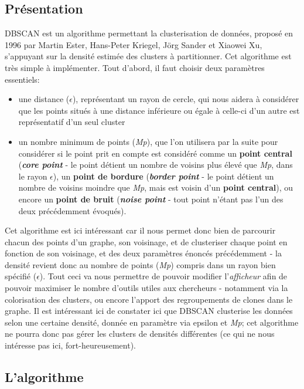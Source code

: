 \documentclass{report}
\begin{document}
\subsection{Présentation}
DBSCAN est un algorithme permettant la clusterisation de données, proposé en 1996 par Martin Ester, Hans-Peter Kriegel, Jörg Sander et Xiaowei Xu, s'appuyant sur la densité estimée des clusters à partitionner.
\newline
Cet algorithme est très simple à implémenter.
\newline
Tout d'abord, il faut choisir deux paramètres essentiels:
\begin{itemize}
\item une distance ($\epsilon$), représentant un rayon de cercle, qui nous aidera à considérer que les points situés à une distance inférieure ou égale à celle-ci d'un autre est représentatif d'un seul cluster
\item un nombre minimum de points (\textit{Mp}), que l'on utilisera par la suite pour considérer si le point prit en compte est considéré comme un \textbf{point central} (\textit{\textbf{core point}} - le point détient un nombre de voisins plus élevé que \textit{Mp}, dans le rayon $\epsilon$), un \textbf{point de bordure} (\textit{\textbf{border point}} - le point détient un nombre de voisins moindre que \textit{Mp}, mais est voisin d'un \textbf{point central}), ou encore un \textbf{point de bruit} (\textit{\textbf{noise point}} - tout point n'étant pas l'un des deux précédemment évoqués).
\end{itemize}
Cet algorithme est ici intéressant car il nous permet donc bien de parcourir chacun des points d'un graphe, son voisinage, et de clusteriser chaque point en fonction de son voisinage, et des deux paramètres énoncés précédemment - la densité revient donc au nombre de points (\textit{Mp}) compris dans un rayon bien spécifié ($\epsilon$). Tout ceci va nous permettre de pouvoir modifier l'\textit{afficheur} afin de pouvoir maximiser le nombre d'outils utiles aux chercheurs - notamment via la colorisation des clusters, ou encore l'apport des regroupements de clones dans le graphe.
\newline
Il est intéressant ici de constater ici que DBSCAN clusterise les données selon une certaine densité, donnée en paramètre via epsilon et \textit{Mp}; cet algorithme ne pourra donc pas gérer les clusters de densités différentes (ce qui ne nous intéresse pas ici, fort-heureusement).

\subsection{L'algorithme}
\end{document}
